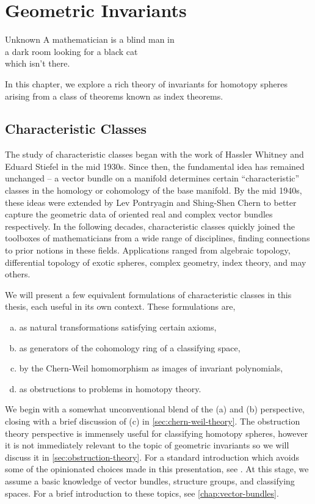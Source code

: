 \chapter{Geometric Invariants}\label{chap:invariants}

\begin{epigraph}{15em}{Unknown}
	A mathematician is a blind man in \\
	a dark room looking for a black cat \\
	which isn’t there.
\end{epigraph}

In this chapter, we explore a rich theory of invariants for homotopy spheres arising from a class of theorems known as index theorems. 

\pagebreak
\section{Characteristic Classes}
The study of characteristic classes began with the work of Hassler Whitney and Eduard Stiefel in the mid 1930s. Since then, the fundamental idea has remained unchanged -- a vector bundle on a manifold determines certain ``characteristic'' classes in the homology or cohomology of the base manifold.
By the mid 1940s, these ideas were extended by Lev Pontryagin and Shing-Shen Chern to better capture the geometric data of oriented real and complex vector bundles respectively. In the following decades, characteristic classes quickly joined the toolboxes of mathematicians from a wide range of disciplines, finding connections to prior notions in these fields.
Applications ranged from algebraic topology, differential topology of exotic spheres, complex geometry, index theory, and may others.

We will present a few equivalent formulations of characteristic classes in this thesis, each useful in its own context. These formulations are,
\begin{enumerate}[(a)]
	\item as natural transformations satisfying certain axioms,
	\item as generators of the cohomology ring of a classifying space,
	\item by the Chern-Weil homomorphism as images of invariant polynomials,
	\item as obstructions to problems in homotopy theory.
\end{enumerate}
We begin with a somewhat unconventional blend of the (a) and (b) perspective, closing with a brief discussion of (c) in \cref{sec:chern-weil-theory}. The obstruction theory perspective is immensely useful for classifying homotopy spheres, however it is not immediately relevant to the topic of geometric invariants so we will discuss it in \cref{sec:obstruction-theory}. For a standard introduction which avoids some of the opinionated choices made in this presentation, see \cite{milnorstasheff1974}.
At this stage, we assume a basic knowledge of vector bundles, structure groups, and classifying spaces. For a brief introduction to these topics, see \cref{chap:vector-bundles}.

